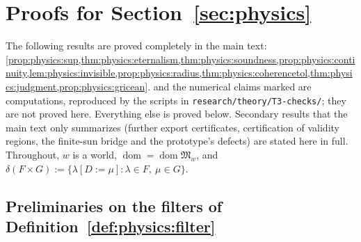 \providecommand{\fM}{\mathfrak{M}}
\providecommand{\fF}{\mathcal{F}}
\providecommand{\fG}{\mathcal{G}}
\providecommand{\fK}{\mathcal{K}}
\providecommand{\tset}[1]{\lVert #1\rVert}
\providecommand{\cder}{\Vdash}
\providecommand{\dom}{\operatorname{dom}}
\providecommand{\osc}{\operatorname{osc}}
\providecommand{\Anc}{\mathrm{Anc}}
\providecommand{\Ccert}{C_{\mathrm{cert}}}
\providecommand{\Asm}{\mathrm{Asm}}
\providecommand{\Ax}{\mathrm{Ax}}

\section{Proofs for Section~\ref{sec:physics}}\label{app:physics}

The following results are proved completely in the main text:
\cref{prop:physics:sup,thm:physics:eternalism,thm:physics:soundness,prop:physics:continuity,lem:physics:invisible,prop:physics:radius,thm:physics:coherencetol,thm:physics:judgment,prop:physics:gricean}.
 and the numerical claims marked  are
computations, reproduced by the scripts in \texttt{research/theory/T3-checks/}; they are
not proved here. Everything else is proved below. Secondary results that the main text only
summarizes (further export certificates, certification of validity regions, the finite-sun
bridge and the prototype's defects) are stated here in full. Throughout, $w$ is a world,
$\dom=\dom\fM_w$, and $\delta(F\times G):=\{\lambda[D{:=}\mu]:\lambda\in F,\ \mu\in G\}$.

\subsection{Preliminaries on the filters of Definition~\ref{def:physics:filter}}

